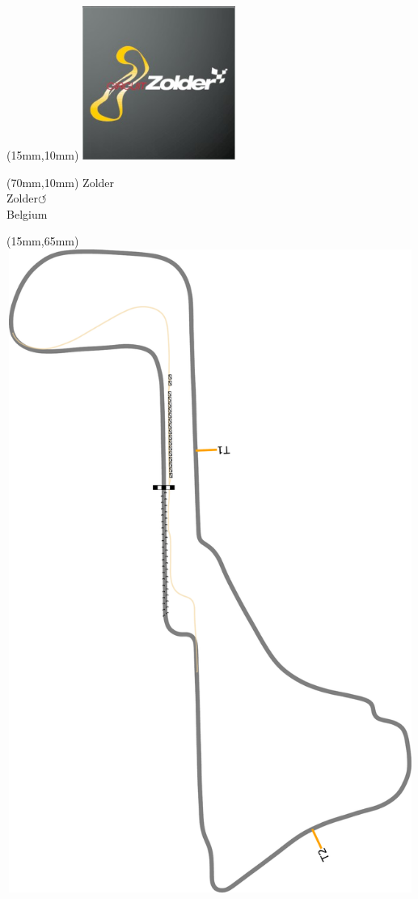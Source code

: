 \null\newpage
\begin{textblock*}{50mm}(15mm,10mm)%
\includegraphics[width=50mm]{LG/2015-05-20_00100.png}
\end{textblock*}
\begin{textblock*}{130mm}(70mm,10mm)%
{\fontsize{20}{20}\selectfont Zolder\\}
{\fontsize{16}{16}\selectfont Zolder\hfill \huge$\circlearrowleft$\\}
{\fontsize{12}{12}\selectfont Belgium\\}
\end{textblock*}
\begin{textblock*}{185mm}(15mm,65mm)%
\centering
\mbox{\includegraphics[width=185mm,height=210mm,keepaspectratio]{PT/ZO.pdf}}
\end{textblock*}
